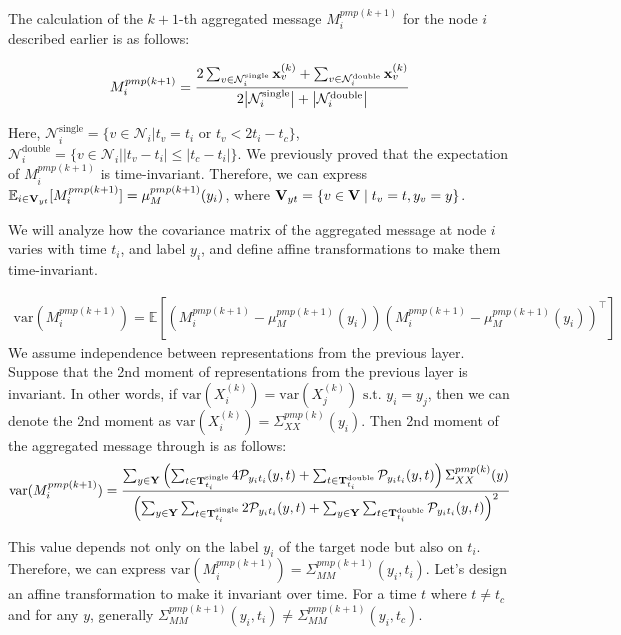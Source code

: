 The calculation of the $k+1$-th aggregated message $M_{i}^{pmp(k+1)}$ for the node $i$ described earlier is as follows:

\begin{align}
M_{i}^{pmp(k+1)} = {{2\sum_{v\in \mathcal{N}^{\text{single}}_i} \bold{x}_{v}^{(k)}+\sum_{v\in \mathcal{N}^{\text{double}}_i} \bold{x}_{v}^{(k)}}\over{2\big|\mathcal{N}^{\text{single}}_i\big| + \big|\mathcal{N}^{\text{double}}_i\big|}}
\end{align}

Here, $\mathcal{N}^{\text{single}}_i=\{v\in \mathcal{N}_i \big| t_v=t_i \text{ or }  t_v < 2t_i - t_{c} \}$, $\mathcal{N}^{\text{double}}_i=\{v\in \mathcal{N}_i\big| | t_v-t_i|\le| t_{c} - t_i | \}$. We previously proved that the expectation of $M_{i}^{pmp(k+1)}$ is time-invariant. Therefore, we can express $\mathbb{E}_{i\in \bold{V}_{yt}} [ M_i^{pmp (k+1)}] =\mu_{M}^{pmp(k+1)}(y_i)$, where $\bold{V}_{yt}= \{v\in \bold{V} \mid t_v = t, y_v = y\}$.

We will analyze how the covariance matrix of the aggregated message at node $i$ varies with time $t_i$, and label $y_i$, and define affine transformations to make them time-invariant.

\begin{align}
\text{var}(M_{i}^{pmp(k+1)})=\mathbb{E}\left[(M_i ^{pmp (k+1)}-\mu_{M}^{pmp(k+1)}(y_i))(M_i ^{pmp (k+1)}-\mu_{M}^{pmp(k+1)}(y_i))^{\top}\right]
\end{align}
We assume independence between representations from the previous layer. Suppose that the 2nd moment of representations from the previous layer is invariant. In other words, if $\text{var}(X_i^{(k)})=\text{var}(X_j^{(k)})\text{ s.t. }y_i=y_j$, then we can denote the 2nd moment as $\text{var}(X_i^{(k)})=\Sigma_{XX}^{pmp(k)}(y_i)$. Then 2nd moment of the aggregated message through \PMP is as follows: 
\begin{align}
\text{var}(M_{i}^{pmp(k+1)}) = {\sum_{y\in \bold{Y}}\left(\sum_{t\in\bold{T}_{t_i}^{\text{single}}}4\mathcal{P}_{y_i t_i}(y, t)+\sum_{t\in\bold{T}_{t_i}^{\text{double}}}\mathcal{P}_{y_i t_i}(y, t)\right)\Sigma_{XX}^{pmp(k)}(y)
\over
\left(\sum_{y\in \bold{Y}}\sum_{t\in\bold{T}_{t_i}^{\text{single}}}2\mathcal{P}_{y_i t_i}(y, t)+\sum_{y\in \bold{Y}}\sum_{t\in\bold{T}_{t_i}^{\text{double}}}\mathcal{P}_{y_i t_i}(y, t)\right)^2}
\end{align}

This value depends not only on the label $y_i$ of the target node but also on $t_i$. Therefore, we can express $\text{var}(M_{i}^{pmp(k+1)})=\Sigma^{pmp(k+1)}_{MM}(y_i,t_i)$. Let's design an affine transformation to make it invariant over time. For a time $t$ where $t \neq t_{c}$ and for any $y$, generally $\Sigma^{pmp(k+1)}_{MM}(y_i,t_i)\neq\Sigma^{pmp(k+1)}_{MM}(y_i,t_{c})$.

